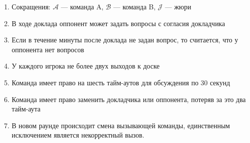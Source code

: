 \documentclass{article}
\begin{document}
\vfill

\begin{enumerate}
\item Сокращения: $\mathcal{A}$ --- команда A, $\mathcal{B}$ --- команда B, $\mathcal{J}$ --- жюри
\item В ходе доклада оппонент может задать вопросы с согласия докладчика
\item Если в течение минуты после доклада не задан вопрос, то считается, что у оппонента нет вопросов
\item У каждого игрока не более двух выходов к доске
\item Команда имеет право на шесть тайм-аутов для обсуждения по 30 секунд
\item Команда имеет право заменить докладчика или оппонента, потеряв за это два тайм-аута
\item В новом раунде происходит смена вызывающей команды, единственным исключением является некорректный вызов.
\end{enumerate}
\end{document}
